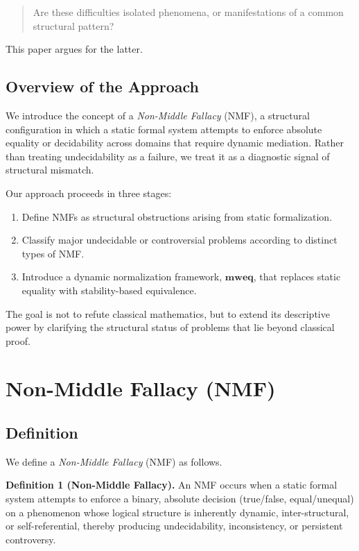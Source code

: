 \documentclass[11pt]{article}
\begin{document}
\begin{quote}
Are these difficulties isolated phenomena, or manifestations of a
common structural pattern?
\end{quote}

This paper argues for the latter.

\subsection{Overview of the Approach}

We introduce the concept of a \emph{Non-Middle Fallacy} (NMF), a structural
configuration in which a static formal system attempts to enforce
absolute equality or decidability across domains that require
dynamic mediation.
Rather than treating undecidability as a failure, we treat it as a
diagnostic signal of structural mismatch.

Our approach proceeds in three stages:

\begin{enumerate}
  \item Define NMFs as structural obstructions arising from static
        formalization.
  \item Classify major undecidable or controversial problems according
        to distinct types of NMF.
  \item Introduce a dynamic normalization framework, $\mathbf{mweq}$,
        that replaces static equality with stability-based equivalence.
\end{enumerate}

The goal is not to refute classical mathematics, but to extend its
descriptive power by clarifying the structural status of problems
that lie beyond classical proof.

\section{Non-Middle Fallacy (NMF)}

\subsection{Definition}

We define a \emph{Non-Middle Fallacy} (NMF) as follows.

\medskip
\noindent
\textbf{Definition 1 (Non-Middle Fallacy).}
An NMF occurs when a static formal system attempts to enforce a binary,
absolute decision (true/false, equal/unequal) on a phenomenon whose
logical structure is inherently dynamic, inter-structural, or
self-referential, thereby producing undecidability, inconsistency,
or persistent controversy.
\medskip
\end{document}
